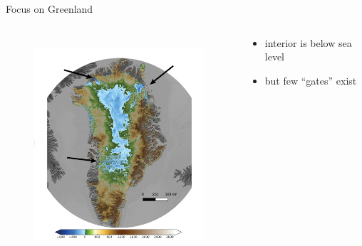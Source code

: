 \documentclass[hide notes,intlimits]{beamer}
\begin{document}
\begin{frame}{Focus on Greenland}
  \begin{columns}[c]
    \begin{column}{.60\linewidth}
      \begin{figure}
        \includegraphics[height=8cm]{gris-marine}
      \end{figure}
    \end{column}
    \begin{column}{.40\linewidth}
      \begin{itemize}
        \item interior is below sea level
        \item but few ``gates'' exist
      \end{itemize}
    \end{column}
  \end{columns}
\end{frame}


  {
} 
\end{document}
